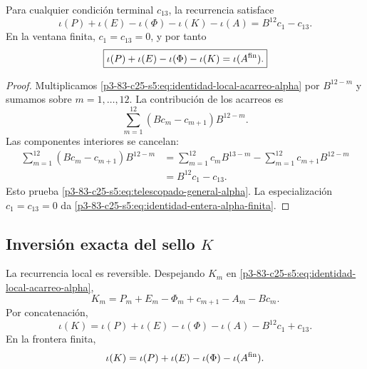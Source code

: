 \begin{theorem}
\label{p3-83-c25-s5:thm:telescopado-acarreos-alpha}
Para cualquier condición terminal \(c_{13}\), la recurrencia satisface
\begin{equation}
 \boxed{
 \iota(P)+\iota(E)-\iota(\Phi)-\iota(K)-\iota(A)
 =B^{12}c_1-c_{13}.}
 \label{p3-83-c25-s5:eq:telescopado-general-alpha}
\end{equation}
En la ventana finita, \(c_1=c_{13}=0\), y por tanto
\begin{equation}
 \boxed{
 \iota(P)+\iota(E)-\iota(\Phi)-\iota(K)
 =\iota(A^{\rm fin}).}
 \label{p3-83-c25-s5:eq:identidad-entera-alpha-finita}
\end{equation}
\end{theorem}

\begin{proof}
Multiplicamos \eqref{p3-83-c25-s5:eq:identidad-local-acarreo-alpha} por
\(B^{12-m}\) y sumamos sobre \(m=1,\ldots,12\). La contribución de los
acarreos es
\[
 \sum_{m=1}^{12}
 (Bc_m-c_{m+1})B^{12-m}.
\]
Las componentes interiores se cancelan:
\begin{align*}
 \sum_{m=1}^{12}(Bc_m-c_{m+1})B^{12-m}
 &=\sum_{m=1}^{12}c_mB^{13-m}
   -\sum_{m=1}^{12}c_{m+1}B^{12-m}\\
 &=B^{12}c_1-c_{13}.
\end{align*}
Esto prueba \eqref{p3-83-c25-s5:eq:telescopado-general-alpha}. La especialización
\(c_1=c_{13}=0\) da \eqref{p3-83-c25-s5:eq:identidad-entera-alpha-finita}.
\end{proof}

\subsection{Inversión exacta del sello \texorpdfstring{\(K\)}{K}}

La recurrencia local es reversible. Despejando \(K_m\) en
\eqref{p3-83-c25-s5:eq:identidad-local-acarreo-alpha},
\begin{equation}
 \boxed{
 K_m=P_m+E_m-\Phi_m+c_{m+1}-A_m-Bc_m.}
 \label{p3-83-c25-s5:eq:inversion-local-k-desde-alpha}
\end{equation}
Por concatenación,
\begin{equation}
 \boxed{
 \iota(K)
 =\iota(P)+\iota(E)-\iota(\Phi)-\iota(A)
  -B^{12}c_1+c_{13}.}
 \label{p3-83-c25-s5:eq:inversion-concatenada-k-desde-alpha}
\end{equation}
En la frontera finita,
\[
 \iota(K)
 =\iota(P)+\iota(E)-\iota(\Phi)-\iota(A^{\rm fin}).
\]

